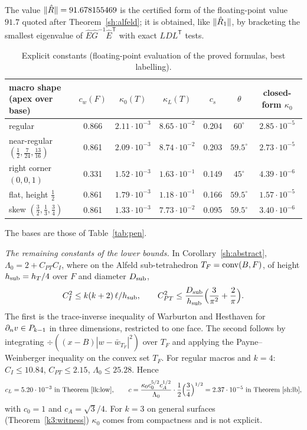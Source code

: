 The value $\lVert \hat R\rVert=91.678155469$ is the certified form of the floating-point value $91.7$ quoted after Theorem~\ref{sh:alfeld}; it is obtained, like $\lVert \hat R_1\rVert$, by bracketing the smallest eigenvalue of $\hat E\hat G^{-1}\hat E^{\mathsf T}$ with exact $LDL^{\mathsf T}$ tests.

\begin{table}[ht]
\centering\small
\caption{Explicit constants (floating-point evaluation of the proved formulas, best labelling).}\label{tab:C1}
\begin{tabular}{lcccccc}
\toprule
macro shape (apex over base) & $c_w(F)$ & $\kappa_0(T)$ & $\kappa_L(T)$ & $c_s$ & $\theta$ & closed-form $\kappa_0$\\
\midrule
regular & 0.866 & $2.11\cdot10^{-3}$ & $8.65\cdot10^{-2}$ & 0.204 & $60^\circ$ & $2.85\cdot10^{-5}$\\
near-regular $(\frac12,\frac7{24},\frac{13}{16})$ & 0.861 & $2.09\cdot10^{-3}$ & $8.74\cdot10^{-2}$ & 0.203 & $59.5^\circ$ & $2.73\cdot10^{-5}$\\
right corner $(0,0,1)$ & 0.331 & $1.52\cdot10^{-3}$ & $1.63\cdot10^{-1}$ & 0.149 & $45^\circ$ & $4.39\cdot10^{-6}$\\
flat, height $\frac12$ & 0.861 & $1.79\cdot10^{-3}$ & $1.18\cdot10^{-1}$ & 0.166 & $59.5^\circ$ & $1.57\cdot10^{-5}$\\
skew $(\frac32,\frac13,\frac34)$ & 0.861 & $1.33\cdot10^{-3}$ & $7.73\cdot10^{-2}$ & 0.095 & $59.5^\circ$ & $3.40\cdot10^{-6}$\\
\bottomrule
\end{tabular}
\end{table}
The bases are those of Table~\ref{tab:pen}.

\emph{The remaining constants of the lower bounds.} In Corollary~\ref{sh:abstract}, $\Lambda_0=2+C_{PT}C_I$, where on the Alfeld sub-tetrahedron $T_F=\operatorname{conv}(B,F)$, of height $h_{\rm sub}=h_T/4$ over $F$ and diameter $D_{\rm sub}$,
\[
C_I^2\le k(k+2)\,\ell/h_{\rm sub},\qquad C_{PT}^2\le\frac{D_{\rm sub}}{h_{\rm sub}}\Bigl(\frac3{\pi^2}+\frac2\pi\Bigr).
\]
The first is the trace-inverse inequality of Warburton and Hesthaven \cite{WarburtonHesthaven2003} for $\partial_n v\in P_{k-1}$ in three dimensions, restricted to one face. The second follows by integrating $\div((x-B)|w-\bar w_{T_F}|^2)$ over $T_F$ and applying the Payne--Weinberger inequality \cite{PayneWeinberger1960} on the convex set $T_F$. For regular macros and $k=4$: $C_I\le10.84$, $C_{PT}\le2.15$, $\Lambda_0\le25.28$. Hence
\[
c_L=5.20\cdot10^{-3}\ \text{in Theorem~\ref{lk:low}},\qquad c=\frac{\kappa_0c_0^{5/2}c_A^{1/2}}{\Lambda_0}\cdot\frac12\Bigl(\frac34\Bigr)^{1/2}=2.37\cdot10^{-5}\ \text{in Theorem~\ref{sh:lb}},
\]
with $c_0=1$ and $c_A=\sqrt3/4$. For $k=3$ on general surfaces (Theorem~\ref{k3:witness}) $\kappa_0$ comes from compactness and is not explicit.


